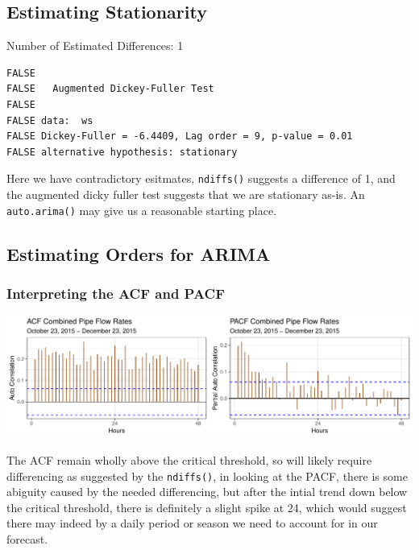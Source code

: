 \documentclass[openany]{book}
\begin{document}
\hypertarget{estimating-stationarity}{%
\subsection{Estimating Stationarity}\label{estimating-stationarity}}

Number of Estimated Differences: 1

\begin{verbatim}
FALSE 
FALSE   Augmented Dickey-Fuller Test
FALSE 
FALSE data:  ws
FALSE Dickey-Fuller = -6.4409, Lag order = 9, p-value = 0.01
FALSE alternative hypothesis: stationary
\end{verbatim}

Here we have contradictory esitmates, \texttt{ndiffs()} suggests a
difference of 1, and the augmented dicky fuller test suggests that we
are stationary as-is. An \texttt{auto.arima()} may give us a reasonable
starting place.

\hypertarget{estimating-orders-for-arima}{%
\subsection{Estimating Orders for
ARIMA}\label{estimating-orders-for-arima}}

\hypertarget{interpreting-the-acf-and-pacf}{%
\subsubsection{Interpreting the ACF and
PACF}\label{interpreting-the-acf-and-pacf}}

\includegraphics{Group2_Project1_Fall2019_files/figure-latex/unnamed-chunk-18-1.pdf}

The ACF remain wholly above the critical threshold, so will likely
require differencing as suggested by the \texttt{ndiffs()}, in looking
at the PACF, there is some abiguity caused by the needed differencing,
but after the intial trend down below the critical threshold, there is
definitely a slight spike at 24, which would suggest there may indeed by
a daily period or season we need to account for in our forecast.
\end{document}
